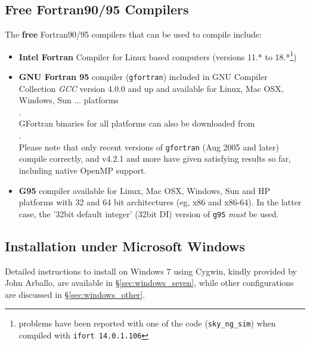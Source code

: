 \documentclass[12pt,twoside]{article}
\begin{document}
\subsection{Free Fortran90/95 Compilers}
\label{sec:freef90compilers}
The {\bf free} Fortran90/95 compilers that can be used to compile \healpix include: 
    \begin{itemize}
      \item {\bf Intel Fortran} Compiler for Linux based computers (versions
11.* to 18.*\footnote{problems have been reported with one of the code (\texttt{sky\_ng\_sim}) when compiled with
\texttt{ifort 14.0.1.106}}) \hfill \\
      \item {\bf GNU Fortran 95} compiler (\texttt{gfortran}) included in GNU Compiler Collection {\em GCC} version 4.0.0
         and up and available for Linux, Mac OSX, Windows, Sun ... platforms
         \hfill \\
          . \hfill \\
         GFortran binaries for all platforms can also be downloaded from  \hfill \\
          . \hfill \\
         Please note that only recent versions of \texttt{gfortran} (Aug 2005
         and later) compile \healpix correctly, and v4.2.1 and more have given satisfying
         results so far, including native OpenMP support.
     \item {\bf G95} compiler available for Linux, Mac OSX, Windows, Sun and HP platforms with 32 and 64 bit architectures (eg, x86 and x86-64). In the latter case, the '32bit default integer' (32bit DI) version of \texttt{g95} {\em must} be used.
         \hfill \\ 
    \end{itemize}

\newpage %
\subsection{Installation under Microsoft Windows}
\label{sec:windows}
Detailed instructions to install \healpix on Windows 7 using Cygwin, kindly provided by John Arballo, 
are available in \S\ref{sec:windows_seven}, 
while other configurations are discussed in \S\ref{sec:windows_other}.
\end{document}
